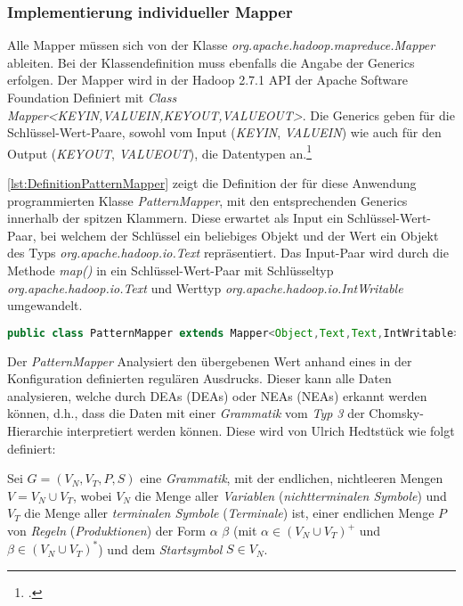 \subsubsection{Implementierung individueller Mapper}\label{subsubsec:IndividuelleMapper}
Alle Mapper müssen sich von der Klasse \textit{org.apache.hadoop.mapreduce.Mapper} ableiten. Bei der Klassendefinition muss ebenfalls die Angabe der \glspl{Generic} erfolgen. Der Mapper wird in der Hadoop 2.7.1 \ac{API} der Apache Software Foundation Definiert mit \textit{Class Mapper<KEYIN,VALUEIN,KEYOUT,VALUEOUT>}. Die \glspl{Generic} geben für die Schlüssel-Wert-Paare, sowohl vom Input (\textit{KEYIN}, \textit{VALUEIN}) wie auch für den Output (\textit{KEYOUT}, \textit{VALUEOUT}), die Datentypen an.\footcite[Vgl.][]{ApacheHadoopApiDokuMapper.2015}

\autoref{lst:DefinitionPatternMapper} zeigt die Definition der für diese Anwendung programmierten Klasse \textit{PatternMapper}, mit den entsprechenden Generics innerhalb der spitzen Klammern. Diese erwartet als Input ein Schlüssel-Wert-Paar, bei welchem der Schlüssel ein beliebiges Objekt und der Wert ein Objekt des Typs \textit{org.apache.hadoop.io.Text} repräsentiert. Das Input-Paar wird durch die Methode \textit{map()} in ein Schlüssel-Wert-Paar mit Schlüsseltyp \textit{org.apache.hadoop.io.Text} und Werttyp \textit{org.apache.hadoop.io.IntWritable} umgewandelt. \\

\begin{lstlisting}[language=Java,caption=Deklaration \textit{PatternMapper} mit Generics,label=lst:DefinitionPatternMapper]
public class PatternMapper extends Mapper<Object,Text,Text,IntWritable>
\end{lstlisting}

Der \textit{PatternMapper} Analysiert den übergebenen Wert anhand eines in der Konfiguration definierten regulären Ausdrucks. Dieser kann alle Daten analysieren, welche durch \aclp{DEA} ({\color{LinkColor}\acsp{DEA}}) oder \aclp{NEA} ({\color{LinkColor}\acsp{NEA}}) erkannt werden können, d.h., dass die Daten mit einer \textit{Grammatik} vom \textit{Typ 3} der Chomsky-Hierarchie interpretiert werden können. Diese wird von Ulrich Hedtstück wie folgt definiert:

Sei $G = (V_N, V_T, P, S)$ eine \textit{Grammatik}, mit der endlichen, nichtleeren Mengen $V = V_N \cup V_T$, wobei $V_N$ die Menge aller \textit{Variablen} (\textit{nichtterminalen Symbole}) und $V_T$ die Menge aller \textit{terminalen Symbole} (\textit{Terminale}) ist, einer endlichen Menge $P$ von \textit{Regeln} (\textit{Produktionen}) der Form $\alpha$ \textrightarrow $\beta$ (mit $\alpha \in (V_N \cup V_T)^+$ und $\beta \in (V_N \cup V_T)^*$) und dem \textit{Startsymbol} $S \in V_N$. 

